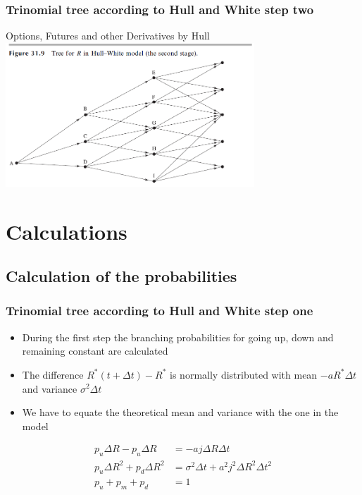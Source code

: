 \documentclass{beamer}
\begin{document}
\begin{frame}
\frametitle{Trinomial tree according to Hull and White step two}
\begin{block}{Options, Futures and other Derivatives by Hull}
\includegraphics[width=0.7\textwidth]{Trinomialbaum hull White step two}
\end{block}

\end{frame}



\section{Calculations}

\subsection{Calculation of the probabilities}
\begin{frame}
\frametitle{Trinomial tree according to Hull and White step one} 
\begin{itemize}
\item During the first step the branching probabilities for going up, down and remaining constant are calculated
\item The difference $R^*(t+\Delta t) - R^*$ is normally distributed with mean $-aR^* \Delta t$ and variance $\sigma ^2 \Delta t$ 
\item We have to equate the theoretical mean and variance with the one in the model
\end{itemize}

\begin{align*}
p_u \Delta R-p_u \Delta R &= -aj\Delta R\Delta t\\
p_u\Delta R^2 + p_d \Delta R^2 &= \sigma ^2 \Delta t + a^2j^2 \Delta R^2 \Delta t^2\\
p_u + p_m + p_d &= 1
\end{align*}


\end{frame}
\end{document}

